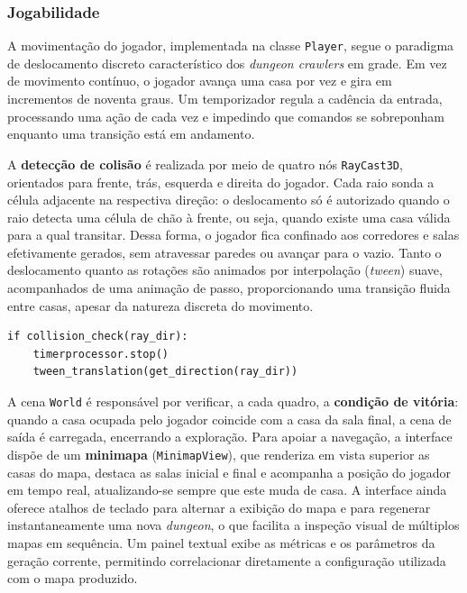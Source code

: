 \documentclass[12pt]{article}
\begin{document}
\subsubsection{Jogabilidade}
A movimentação do jogador, implementada na classe \texttt{Player}, segue o paradigma de deslocamento discreto característico dos
\textit{dungeon crawlers} em grade. Em vez de movimento contínuo, o jogador avança uma casa por vez e gira em incrementos de
noventa graus. Um temporizador regula a cadência da entrada, processando uma ação de cada vez e impedindo que comandos se
sobreponham enquanto uma transição está em andamento.
 
A \textbf{detecção de colisão} é realizada por meio de quatro nós \texttt{RayCast3D}, orientados para frente, trás, esquerda e
direita do jogador. Cada raio sonda a célula adjacente na respectiva direção: o deslocamento só é autorizado quando o raio detecta
uma célula de chão à frente, ou seja, quando existe uma casa válida para a qual transitar. Dessa forma, o jogador fica confinado
aos corredores e salas efetivamente gerados, sem atravessar paredes ou avançar para o vazio. Tanto o deslocamento quanto as
rotações são animados por interpolação (\textit{tween}) suave, acompanhados de uma animação de passo, proporcionando uma
transição fluida entre casas, apesar da natureza discreta do movimento.
 
\begin{lstlisting}[caption={Trecho do processamento de movimento do jogador.}, label={lst:player}]
if collision_check(ray_dir):
    timerprocessor.stop()
    tween_translation(get_direction(ray_dir))
\end{lstlisting}
 
A cena \texttt{World} é responsável por verificar, a cada quadro, a \textbf{condição de vitória}: quando a casa ocupada pelo
jogador coincide com a casa da sala final, a cena de saída é carregada, encerrando a exploração. Para apoiar a navegação, a
interface dispõe de um \textbf{minimapa} (\texttt{MinimapView}), que renderiza em vista superior as casas do mapa, destaca as
salas inicial e final e acompanha a posição do jogador em tempo real, atualizando-se sempre que este muda de casa. A interface
ainda oferece atalhos de teclado para alternar a exibição do mapa e para regenerar instantaneamente uma nova \textit{dungeon}, o
que facilita a inspeção visual de múltiplos mapas em sequência. Um painel textual exibe as métricas e os parâmetros da geração
corrente, permitindo correlacionar diretamente a configuração utilizada com o mapa produzido.
 
\end{document}
